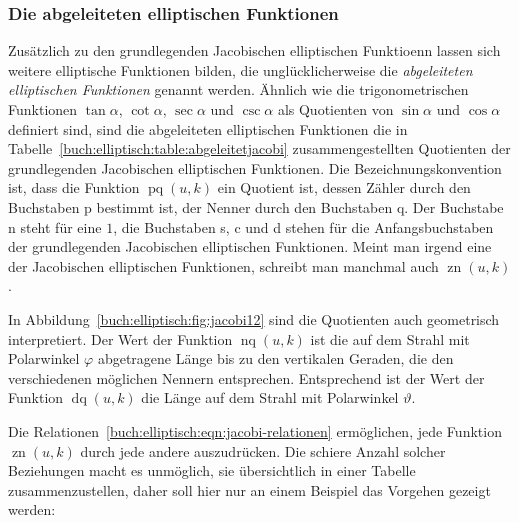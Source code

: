 \subsubsection{Die abgeleiteten elliptischen Funktionen}
Zusätzlich zu den grundlegenden Jacobischen elliptischen Funktioenn
lassen sich weitere elliptische Funktionen bilden, die unglücklicherweise
die {\em abgeleiteten elliptischen Funktionen} genannt werden.
Ähnlich wie die trigonometrischen Funktionen $\tan\alpha$, $\cot\alpha$,
$\sec\alpha$ und $\csc\alpha$ als Quotienten von $\sin\alpha$ und
$\cos\alpha$ definiert sind, sind die abgeleiteten elliptischen Funktionen
die in Tabelle~\ref{buch:elliptisch:table:abgeleitetjacobi} zusammengestellten
Quotienten der grundlegenden Jacobischen elliptischen Funktionen.
Die Bezeichnungskonvention ist, dass die Funktion $\operatorname{pq}(u,k)$
ein Quotient ist, dessen Zähler durch den Buchstaben p bestimmt ist,
der Nenner durch den Buchstaben q.
Der Buchstabe n steht für eine $1$, die Buchstaben s, c und d stehen für
die Anfangsbuchstaben der grundlegenden Jacobischen elliptischen
Funktionen.
Meint man irgend eine der Jacobischen elliptischen Funktionen, schreibt
man manchmal auch $\operatorname{zn}(u,k)$.

In Abbildung~\ref{buch:elliptisch:fig:jacobi12} sind die Quotienten auch
geometrisch interpretiert.
Der Wert der Funktion $\operatorname{nq}(u,k)$ ist die auf dem Strahl
mit Polarwinkel $\varphi$ abgetragene Länge bis zu den vertikalen
Geraden, die den verschiedenen möglichen Nennern entsprechen.
Entsprechend ist der Wert der Funktion $\operatorname{dq}(u,k)$ die
Länge auf dem Strahl mit Polarwinkel $\vartheta$.

Die Relationen~\ref{buch:elliptisch:eqn:jacobi-relationen}
ermöglichen, jede Funktion $\operatorname{zn}(u,k)$ durch jede
andere auszudrücken.
Die schiere Anzahl solcher Beziehungen macht es unmöglich, sie 
übersichtlich in einer Tabelle zusammenzustellen, daher soll hier
nur an einem Beispiel das Vorgehen gezeigt werden:


